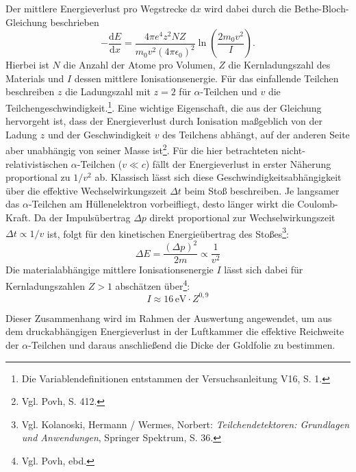 Der mittlere Energieverlust pro Wegstrecke $\mathrm{d}x$ wird dabei durch die Bethe-Bloch-Gleichung beschrieben
\begin{equation}
    -\frac{\mathrm{d}E}{\mathrm{d}x} = \frac{4\pi e^4 z^2 N Z}{m_0 v^2 (4\pi\epsilon_0)^2} \ln \left( \frac{2 m_0 v^2}{I} \right).
    \label{eq:bethe-bloch}
\end{equation}
Hierbei ist $N$ die Anzahl der Atome pro Volumen, $Z$ die Kernladungszahl des Materials und $I$ dessen mittlere Ionisationsenergie. Für das einfallende Teilchen beschreiben $z$ die Ladungszahl mit $z=2$ für $\alpha$-Teilchen und $v$ die Teilchengeschwindigkeit.\footnote{Die Variablendefinitionen entstammen der Versuchsanleitung V16, S. 1.}.
Eine wichtige Eigenschaft, die aus der Gleichung hervorgeht ist, dass der Energieverlust durch Ionisation maßgeblich von der Ladung $z$ und der Geschwindigkeit $v$ des Teilchens abhängt, auf der anderen Seite aber unabhängig von seiner Masse ist\footnote{Vgl. Povh, S. 412.}. Für die hier betrachteten nicht-relativistischen $\alpha$-Teilchen ($v \ll c$) fällt der Energieverlust in erster Näherung proportional zu $1/v^2$ ab. Klassisch lässt sich diese Geschwindigkeitsabhängigkeit über die effektive Wechselwirkungszeit $\Delta t$ beim Stoß beschreiben. Je langsamer das $\alpha$-Teilchen am Hüllenelektron vorbeifliegt, desto länger wirkt die Coulomb-Kraft. Da der Impulsübertrag $\Delta p$ direkt proportional zur Wechselwirkungszeit $\Delta t \propto 1/v$ ist, folgt für den kinetischen Energieübertrag des Stoßes\footnote{Vgl. Kolanoski, Hermann / Wermes, Norbert: \textit{Teilchendetektoren: Grundlagen und Anwendungen}, Springer Spektrum, S. 36.}:
\begin{equation*}
    \Delta E = \frac{(\Delta p)^2}{2m} \propto \frac{1}{v^2}
\end{equation*}
Die materialabhängige mittlere Ionisationsenergie $I$ lässt sich dabei für Kernladungszahlen $Z > 1$ abschätzen über\footnote{Vgl. Povh, ebd.}:
\begin{equation*}
    I \approx 16\,\text{eV} \cdot Z^{0,9}
\end{equation*}

Dieser Zusammenhang wird im Rahmen der Auswertung angewendet, um aus dem druckabhängigen Energieverlust in der Luftkammer die effektive Reichweite der $\alpha$-Teilchen und daraus anschließend die Dicke der Goldfolie zu bestimmen.

